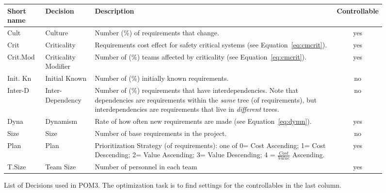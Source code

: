 \documentclass[10pt,journal,compsoc]{IEEEtran}
\newcommand{\eq}[1]{Equation~\ref{eq:#1}}
\begin{document}
\begin{figure*}%
\scriptsize

  \centering
    \begin{tabular}{|l|l|p{4in}|c|}
        \hline
        Short name &Decision             & Description         &Controllable                                        \\ \hline
        Cult&Culture              & Number (\%) of requirements that change. & yes \\\hline
        Crit&Criticality           & Requirements cost effect for safety critical systems  (see \eq{cmcrit}). & yes\\\hline
        Crit.Mod&Criticality Modifier & Number of (\%) teams affected by criticality   (see \eq{cmcrit}).   & yes           \\ \hline
        Init. Kn&Initial Known        & Number of (\%) initially known requirements.             & no     \\ \hline
        Inter-D&Inter-Dependency     & Number of (\%) requirements that have interdependencies.  Note that dependencies are requirements within
the {\em same} tree (of requirements), but interdependencies are requirements that live in {\em different} trees.   & no            \\\hline
        Dyna&Dynamism             & Rate of how often new requirements are made (see \eq{dymn}). & yes                    \\ \hline
        Size&Size            & Number of base requirements in the project.& no \\        \hline
        Plan&Plan                 & Prioritization Strategy (of requirements): one of
        0= Cost Ascending;  1= Cost Descending; 2= Value Ascending; 3= Value Descending;
        4 = $\frac{Cost}{Value}$ Ascending.
 & yes \\\hline
     T.Size&Team Size            & Number of personnel in each team   & yes                         \\ 
        \hline
    \end{tabular}
    \caption {List of Decisions used in POM3. 
The optimization task is to find settings for the controllables in the last column.
}\label{fig:pom3decisions}
\end{figure*}
\end{document}
